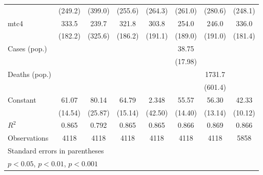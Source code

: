 \documentclass{article}
\begin{document}
{\begin{longtable}{l*{7}{c}}
                &  (249.2)         &  (399.0)         &  (255.6)         &  (264.3)         &  (261.0)         &  (280.6)         &  (248.1)         \\
mtc4            &    333.5         &    239.7         &    321.8         &    303.8         &    254.0         &    246.0         &    336.0         \\
                &  (182.2)         &  (325.6)         &  (186.2)         &  (191.1)         &  (189.0)         &  (191.0)         &  (181.4)         \\
Cases (pop.)    &                  &                  &                  &                  &    38.75\sym{*}  &                  &                  \\
                &                  &                  &                  &                  &  (17.98)         &                  &                  \\
Deaths (pop.)   &                  &                  &                  &                  &                  &   1731.7\sym{**} &                  \\
                &                  &                  &                  &                  &                  &  (601.4)         &                  \\
Constant        &    61.07\sym{***}&    80.14\sym{**} &    64.79\sym{***}&    2.348         &    55.57\sym{***}&    56.30\sym{***}&    42.33\sym{***}\\
                &  (14.54)         &  (25.87)         &  (15.14)         &  (42.50)         &  (14.40)         &  (13.14)         &  (10.12)         \\
\hline
\(R^{2}\)       &    0.865         &    0.792         &    0.865         &    0.865         &    0.866         &    0.869         &    0.866         \\
Observations    &     4118         &     4118         &     4118         &     4118         &     4118         &     4118         &     5858         \\
\hline\hline
\multicolumn{8}{l}{\footnotesize Standard errors in parentheses}\\
\multicolumn{8}{l}{\footnotesize \sym{*} \(p<0.05\), \sym{**} \(p<0.01\), \sym{***} \(p<0.001\)}\\
\end{longtable}
}
\end{document}
